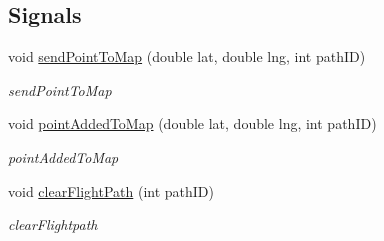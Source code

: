 \subsection*{Signals}
\begin{DoxyCompactItemize}
\item 
void \hyperlink{class_map_widget_afb12c166145f973d1278270628a9faf6}{send\+Point\+To\+Map} (double lat, double lng, int path\+I\+D)
\begin{DoxyCompactList}\small\item\em send\+Point\+To\+Map \end{DoxyCompactList}\item 
void \hyperlink{class_map_widget_a89b74a366c4f6958d448283621357622}{point\+Added\+To\+Map} (double lat, double lng, int path\+I\+D)
\begin{DoxyCompactList}\small\item\em point\+Added\+To\+Map \end{DoxyCompactList}\item 
void \hyperlink{class_map_widget_a9ad5615b0a835998172b61de2e61a12c}{clear\+Flight\+Path} (int path\+I\+D)
\begin{DoxyCompactList}\small\item\em clear\+Flightpath \end{DoxyCompactList}\end{DoxyCompactItemize}
